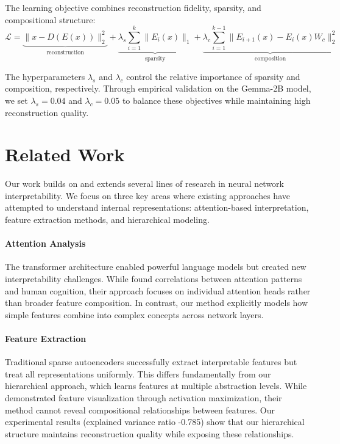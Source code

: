 \documentclass{article} %
\begin{document}
The learning objective combines reconstruction fidelity, sparsity, and compositional structure:
\begin{equation}
    \mathcal{L} = \underbrace{\|x - D(E(x))\|_2^2}_{\text{reconstruction}} + \underbrace{\lambda_s\sum_{i=1}^k\|E_i(x)\|_1}_{\text{sparsity}} + \underbrace{\lambda_c\sum_{i=1}^{k-1}\|E_{i+1}(x) - E_i(x)W_c\|_2^2}_{\text{composition}}
\end{equation}

The hyperparameters $\lambda_s$ and $\lambda_c$ control the relative importance of sparsity and composition, respectively. Through empirical validation on the Gemma-2B model, we set $\lambda_s=0.04$ and $\lambda_c=0.05$ to balance these objectives while maintaining high reconstruction quality.

\section{Related Work}
\label{sec:related}

Our work builds on and extends several lines of research in neural network interpretability. We focus on three key areas where existing approaches have attempted to understand internal representations: attention-based interpretation, feature extraction methods, and hierarchical modeling.

\paragraph{Attention Analysis} The transformer architecture \cite{vaswani2017attention} enabled powerful language models but created new interpretability challenges. While \citet{Eberle2022DoTM} found correlations between attention patterns and human cognition, their approach focuses on individual attention heads rather than broader feature composition. In contrast, our method explicitly models how simple features combine into complex concepts across network layers.

\paragraph{Feature Extraction} Traditional sparse autoencoders \cite{goodfellow2016deep} successfully extract interpretable features but treat all representations uniformly. This differs fundamentally from our hierarchical approach, which learns features at multiple abstraction levels. While \citet{radford2019language} demonstrated feature visualization through activation maximization, their method cannot reveal compositional relationships between features. Our experimental results (explained variance ratio -0.785) show that our hierarchical structure maintains reconstruction quality while exposing these relationships.
\end{document}
